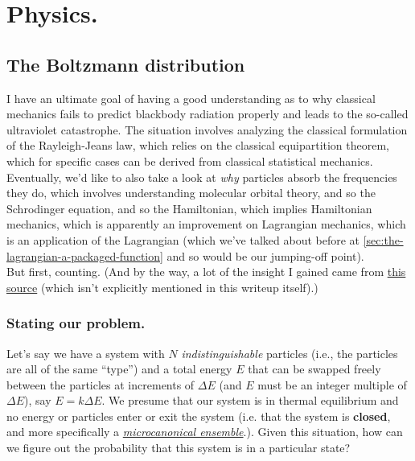 \documentclass[letterpaper,12pt]{report}
\begin{document}
\chapter{Physics.}\label{chapter:physics}



\section{The Boltzmann distribution}



I have an ultimate goal of having a good understanding as to why classical mechanics
fails to predict blackbody radiation properly and leads to the so-called ultraviolet
catastrophe. The situation involves analyzing the classical formulation of the
Rayleigh-Jeans law, which relies on the classical equipartition theorem, which for specific
cases can be derived from classical statistical mechanics.
\\
Eventually, we'd like to also take a look at \emph{why} particles absorb the frequencies
they do, which involves understanding molecular orbital theory, and so the Schrodinger equation,
and so the Hamiltonian, which implies Hamiltonian mechanics, which is apparently an improvement
on Lagrangian mechanics, which is an application of the Lagrangian (which 
we've talked about before at
\ref{sec:the-lagrangian-a-packaged-function}
and so would be our
jumping-off point).
\\
But first, counting. (And by the way, a lot of the insight I gained came from
\href{https://courses.physics.ucsd.edu/2017/Spring/physics4e/boltzmann.pdf}
{this source} (which isn't explicitly mentioned in this writeup itself).)

\subsection{Stating our problem.}

Let's say we have a system with \(N\) \emph{indistinguishable}
particles 
(i.e., the particles are all of the same ``type'') 
and a total energy
\(E\) that can be swapped freely between the particles at increments of \(\Delta E\) (and
\(E\) must be an integer multiple of \(\Delta E\)), say
\(E = k\Delta E\). We presume that our system is in 
thermal equilibrium and no energy or particles enter or exit the system (i.e. that the system
is \textbf{closed}, and more specifically a
\emph{\href{https://en.wikipedia.org/wiki/Microcanonical_ensemble}{microcanonical ensemble}}.).
Given this situation, how can we figure out the probability
that this system is in a particular state?
\end{document}
